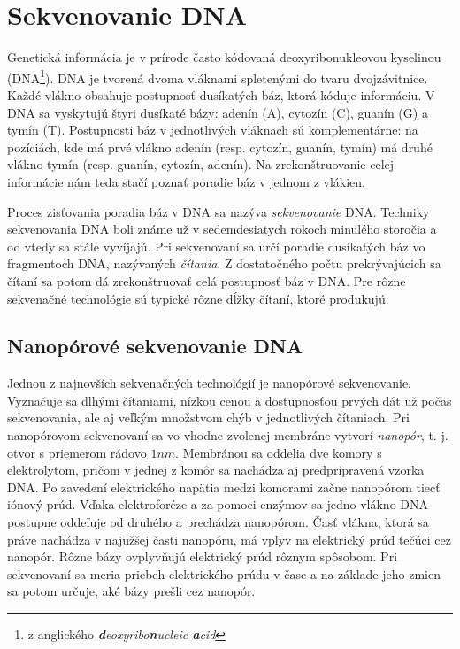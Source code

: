 \chapter{Sekvenovanie DNA}

\label{kap:sekvenovanie}

Genetická informácia je v prírode často kódovaná deoxyribonukleovou kyselinou (DNA\footnote{z anglického 
\emph{\textbf{d}eoxyribo\textbf{n}ucleic \textbf{a}cid}}). DNA je tvorená dvoma vláknami spletenými
do tvaru dvojzávitnice. Každé vlákno obsahuje postupnosť dusíkatých báz, ktorá kóduje informáciu. V DNA 
sa 
vyskytujú štyri
dusíkaté bázy: adenín (A), cytozín (C), guanín (G) a tymín (T). Postupnosti báz v jednotlivých vláknach 
sú 
komplementárne: na pozíciách, kde má prvé vlákno adenín 
(resp. cytozín, guanín, tymín) má druhé vlákno tymín (resp. guanín, cytozín, adenín). Na 
zrekonštruovanie 
celej informácie nám teda stačí poznať poradie báz v jednom z vlákien.

Proces zisťovania poradia báz v DNA sa nazýva \emph{sekvenovanie} DNA. Techniky sekvenovania DNA
boli známe už v sedemdesiatych rokoch minulého storočia a od vtedy sa stále vyvíjajú. Pri sekvenovaní
sa určí poradie dusíkatých báz vo fragmentoch DNA, nazývaných \emph{čítania}. Z dostatočného počtu 
prekrývajúcich sa čítaní sa potom dá zrekonštruovať celá postupnosť báz v DNA. Pre rôzne sekvenačné 
technológie sú typické rôzne dĺžky čítaní, ktoré produkujú.

\section{Nanopórové sekvenovanie DNA}

Jednou z najnovších sekvenačných technológií je nanopórové sekvenovanie. Vyznačuje sa dlhými čítaniami,
nízkou cenou a dostupnosťou prvých dát už počas sekvenovania, ale aj veľkým množstvom chýb v 
jednotlivých čítaniach. Pri nanopórovom sekvenovaní sa vo vhodne zvolenej membráne vytvorí 
\emph{nanopór}, t. j. otvor s priemerom rádovo $1 \si{nm}$. Membránou sa oddelia dve komory s 
elektrolytom, pričom v jednej z komôr sa nachádza aj predpripravená vzorka DNA.
Po zavedení elektrického napätia medzi komorami začne nanopórom tiecť iónový prúd. Vďaka elektroforéze a 
za pomoci enzýmov sa jedno vlákno DNA postupne oddeľuje od druhého a prechádza nanopórom. Časť vlákna, 
ktorá sa práve nachádza v najužšej časti nanopóru, má vplyv na elektrický prúd tečúci cez nanopór. Rôzne 
bázy ovplyvňujú elektrický prúd rôznym spôsobom. Pri sekvenovaní sa meria priebeh elektrického prúdu v 
čase a na základe jeho zmien sa potom určuje, aké bázy prešli cez nanopór.

